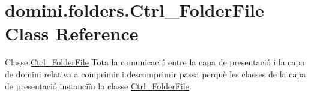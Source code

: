 \hypertarget{classdomini_1_1folders_1_1Ctrl__FolderFile}{}\section{domini.\+folders.\+Ctrl\+\_\+\+Folder\+File Class Reference}
\label{classdomini_1_1folders_1_1Ctrl__FolderFile}


Classe \hyperlink{classdomini_1_1folders_1_1Ctrl__FolderFile}{Ctrl\+\_\+\+Folder\+File} Tota la comunicació entre la capa de presentació i la capa de domini relativa a comprimir i descomprimir passa perquè les classes de la capa de presentació instanciïn la classe \hyperlink{classdomini_1_1folders_1_1Ctrl__FolderFile}{Ctrl\+\_\+\+Folder\+File}.  


